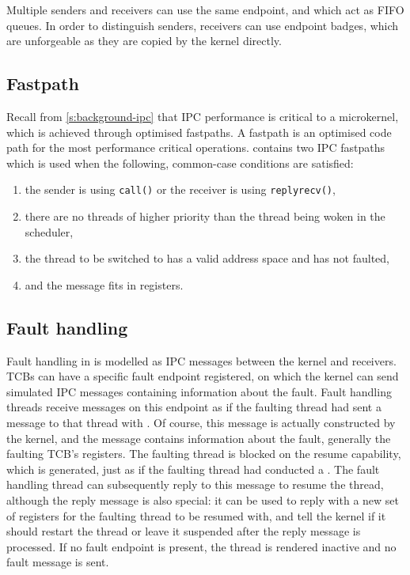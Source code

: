 Multiple senders and receivers can use the same endpoint, and which act as \gls{FIFO}
queues. In order to distinguish senders, receivers can use endpoint badges, which are unforgeable as
they are copied by the kernel directly. 

\subsection{Fastpath}

Recall from \cref{s:background-ipc} that \gls{IPC} performance is critical to a microkernel, which
is achieved through optimised fastpaths. A fastpath is an optimised code path for the most
performance critical operations. \selfour
contains two \gls{IPC} fastpaths which is used when the following, common-case conditions are satisfied:

\begin{enumerate}
    \item the sender is using \texttt{call()} or the receiver is using \texttt{replyrecv()},
    \item there are no threads of higher priority than the thread being woken in the scheduler,
    \item the thread to be switched to has a valid address space and has not faulted,
    \item and the message fits in registers.
\end{enumerate}

\subsection{Fault handling}

Fault handling in \selfour is modelled as IPC messages between the kernel and receivers. 
\glspl{TCB} can have a specific fault endpoint registered, on which the kernel can send simulated
\gls{IPC} messages containing information about the fault. Fault handling threads receive messages
on this endpoint as if the faulting thread had sent a message to that thread with . Of
course, this message is actually constructed by the kernel, and the message contains information
about the fault, generally the faulting \gls{TCB}'s registers. The faulting thread is blocked on the
resume capability, which is generated, just as if the faulting thread had conducted a .
The fault handling thread can subsequently reply to this message to
resume the thread, although the reply message is also special: it can be used to reply with a new
set of registers for the faulting thread to be resumed with, and tell the kernel if it should
restart the thread or leave it suspended after the reply message is processed.
If no fault endpoint is present, the
thread is rendered inactive and no fault message is sent. 

